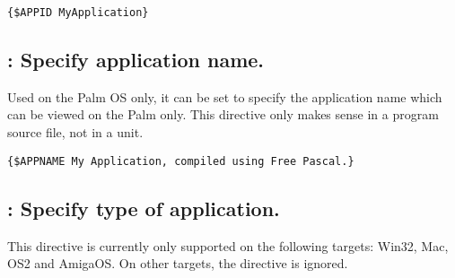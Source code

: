 \begin{verbatim}
{$APPID MyApplication}
\end{verbatim}

\subsection{ : Specify application name.}
Used on the Palm OS only, it can be set to specify the application name
which can be viewed on the Palm only. This directive only makes sense in a
program source file, not in a unit.

\begin{verbatim}
{$APPNAME My Application, compiled using Free Pascal.}
\end{verbatim}

\subsection{ : Specify type of application.}
This directive is currently only supported on the following targets:
 Win32, Mac, OS2 and AmigaOS. On other targets, the directive is ignored.

